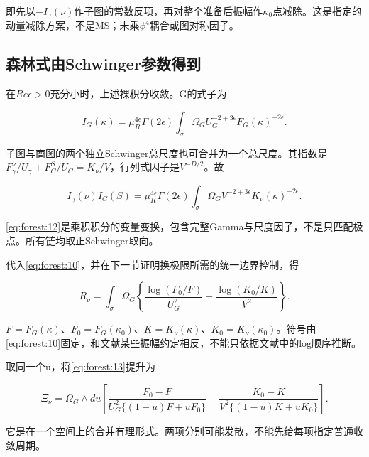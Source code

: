 \documentclass[11pt,a4paper,oneside]{ctexart}
\theoremstyle{cnplain}
\theoremstyle{definition}
\theoremstyle{remark}
\numberwithin{equation}{section}
\begin{document}
即先以\(- I_\gamma (\nu )\)作子图的常数反项，再对整个准备后振幅作\(\kappa _0\)点减除。这是指定的动量减除方案，不是MS；未乘\(\phi ^{4}\)耦合或图对称因子。


\subsection{森林式由Schwinger参数得到}\label{sec:forest:3}

在\(Re \epsilon >0\)充分小时，上述裸积分收敛。G的式子为

\begin{equation}
I_G(\kappa)=\mu_R^{4\epsilon}\Gamma(2\epsilon)
             \int_\sigma \Omega_G
                  U_G^{-2+3\epsilon}F_G(\kappa)^{-2\epsilon}.    \label{eq:forest:11}
\end{equation}

子图与商图的两个独立Schwinger总尺度也可合并为一个总尺度。其指数是\(F_\gamma ^\nu/U_\gamma +F_C^S/U_C=K_\nu /V\)，行列式因子是\(V^{-D/2}\)。故

\begin{equation}
I_\gamma(\nu)I_C(S)=\mu_R^{4\epsilon}\Gamma(2\epsilon)
             \int_\sigma\Omega_G V^{-2+3\epsilon}
                                      K_\nu(\kappa)^{-2\epsilon}.          \label{eq:forest:12}
\end{equation}

\eqref{eq:forest:12}是乘积积分的变量变换，包含完整Gamma与尺度因子，不是只匹配极点。所有链均取正Schwinger取向。

代入\eqref{eq:forest:10}，并在下一节证明换极限所需的统一边界控制，得

\begin{equation}
R_\nu=\int_\sigma\Omega_G
 \left\{\frac{\log(F_0/F)}{U_G^2}
      -\frac{\log(K_0/K)}{V^2}\right\}.                         \label{eq:forest:13}
\end{equation}

\(F=F_G(\kappa )\)、\(F_0=F_G(\kappa _0)\)、\(K=K_\nu (\kappa )\)、\(K_0=K_\nu (\kappa _0)\)。符号由\eqref{eq:forest:10}固定，和文献某些振幅约定相反，不能只依据文献中的log顺序推断。

取同一个u，将\eqref{eq:forest:13}提升为

\begin{equation}
\Xi_\nu=\Omega_G\wedge du\left[
 \frac{F_0-F}{U_G^2\{(1-u)F+uF_0\}}
 -
 \frac{K_0-K}{V^2\{(1-u)K+uK_0\}}\right].                       \label{eq:forest:14}
\end{equation}

它是在一个空间上的合并有理形式。两项分别可能发散，不能先给每项指定普通收敛周期。
\end{document}
